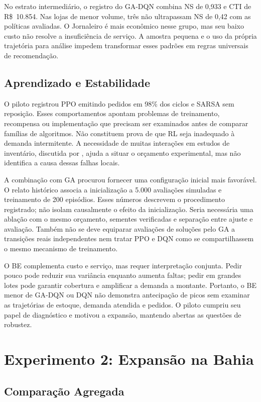 No estrato intermediário, o registro do GA-DQN combina NS de 0,933 e CTI de R\$~10.854. Nas lojas de menor volume, três não ultrapassam NS de 0,42 com as políticas avaliadas. O Jornaleiro é mais econômico nesse grupo, mas seu baixo custo não resolve a insuficiência de serviço. A amostra pequena e o uso da própria trajetória para análise impedem transformar esses padrões em regras universais de recomendação.

\subsection{Aprendizado e Estabilidade}

O piloto registrou PPO emitindo pedidos em 98\% dos ciclos e SARSA sem reposição. Esses comportamentos apontam problemas de treinamento, recompensa ou implementação que precisam ser examinados antes de comparar famílias de algoritmos. Não constituem prova de que RL seja inadequado à demanda intermitente. A necessidade de muitas interações em estudos de inventário, discutida por \citet{Oroojlooyjadid2022BeerGameDQN}, ajuda a situar o orçamento experimental, mas não identifica a causa dessas falhas locais.

A combinação com GA procurou fornecer uma configuração inicial mais favorável. O relato histórico associa a inicialização a 5.000 avaliações simuladas e treinamento de 200 episódios. Esses números descrevem o procedimento registrado; não isolam causalmente o efeito da inicialização. Seria necessária uma ablação com o mesmo orçamento, sementes verificadas e separação entre ajuste e avaliação. Também não se deve equiparar avaliações de soluções pelo GA a transições reais independentes nem tratar PPO e DQN como se compartilhassem o mesmo mecanismo de treinamento.

O BE complementa custo e serviço, mas requer interpretação conjunta. Pedir pouco pode reduzir sua variância enquanto aumenta faltas; pedir em grandes lotes pode garantir cobertura e amplificar a demanda a montante. Portanto, o BE menor de GA-DQN ou DQN não demonstra antecipação de picos sem examinar as trajetórias de estoque, demanda atendida e pedidos. O piloto cumpriu seu papel de diagnóstico e motivou a expansão, mantendo abertas as questões de robustez.

\section{Experimento 2: Expansão na Bahia}

\subsection{Comparação Agregada}

